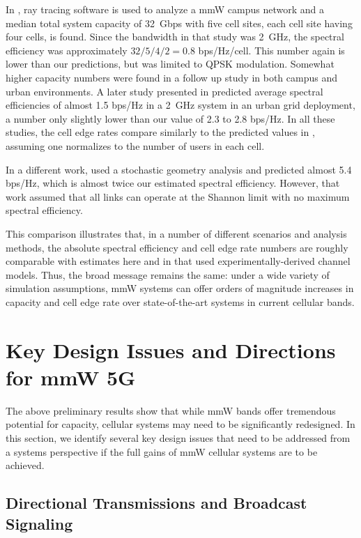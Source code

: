 \documentclass[journal]{IEEEtran}
\begin{document}
In \cite{PietBRPC:12},
ray tracing software is used to analyze
a mmW campus network and  a median total system capacity
of 32~Gbps with five cell sites, each cell site having four cells, is found.
Since the bandwidth in that study was 2~GHz, the spectral efficiency was
approximately $32/5/4/2=0.8$ bps/Hz/cell.  This number again is lower than our predictions,
but \cite{PietBRPC:12} was limited to QPSK modulation.
Somewhat higher capacity numbers were found in a follow up
study \cite{abouelseoud2013system} in both campus and urban environments.
A later study presented in \cite{Ghosh-mmw:2013} predicted average
spectral efficiencies of almost 1.5 bps/Hz in a 2~GHz system
in an urban grid deployment, a number only slightly lower than our
value of 2.3 to 2.8 bps/Hz.
In all these studies, the cell edge rates
compare similarly to the predicted values in
\cite{AkLiuRanRapEr:13-arxiv}, assuming one normalizes to the
number of users in each cell.

In a different work, \cite{AkoumAyaHeath:12} used a stochastic geometry analysis
and predicted almost 5.4 bps/Hz, which is almost twice our estimated spectral
efficiency.  However, that work assumed that
all links can operate at the Shannon limit
with no maximum spectral efficiency.

This comparison illustrates that, in a number of different scenarios
and analysis methods, the absolute spectral efficiency and
cell edge rate numbers are roughly comparable with estimates here and
in  \cite{AkLiuRanRapEr:13-arxiv} that used experimentally-derived
channel models.
Thus, the broad message remains the same:  under a wide variety of simulation
assumptions, mmW systems can offer orders of magnitude increases in capacity
and cell edge rate over state-of-the-art systems in current cellular bands.


\section{Key Design Issues and Directions for mmW 5G} \label{sec:directions}

The above preliminary results show that while
mmW bands offer tremendous potential for capacity, cellular systems may need
to be significantly redesigned.
In this section, we identify several key design issues that need to be addressed
from a systems perspective if the full gains of mmW cellular systems are to be achieved.

\subsection{Directional Transmissions and Broadcast Signaling}
\end{document}
